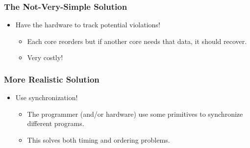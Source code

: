 \documentclass[10pt]{article}
\begin{document}
\subsubsection*{The Not-Very-Simple Solution}
\begin{itemize}
    \item Have the hardware to track potential violations!
    \begin{itemize}
        \item Each core reorders but if another core needs that data, it should recover.
        \item Very costly!
    \end{itemize}
\end{itemize}
\subsubsection*{More Realistic Solution}
\begin{itemize}
    \item Use synchronization!
    \begin{itemize}
        \item The programmer (and/or hardware) use some primitives to synchronize different programs.
        \item This solves both timing and ordering problems.
    \end{itemize}
\end{itemize}
\end{document}
